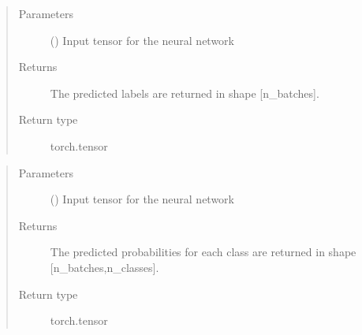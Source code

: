 \documentclass[letterpaper,10pt,english]{sphinxmanual}
\begin{document}
\begin{fulllineitems}

\begin{fulllineitems}
\label{\detokenize{models:models.CNN4.model.predict}}
\pysigstartsignatures
{}
\pysigstopsignatures\begin{quote}\begin{description}
\item[{Parameters}] \leavevmode
\sphinxAtStartPar
{} () \textendash{} Input tensor for the neural network

\item[{Returns}] \leavevmode
\sphinxAtStartPar
{} \textendash{} The predicted labels are returned in shape {[}n\_batches{]}.

\item[{Return type}] \leavevmode
\sphinxAtStartPar
torch.tensor

\end{description}\end{quote}

\end{fulllineitems}


\begin{fulllineitems}
\label{\detokenize{models:models.CNN4.model.prob}}
\pysigstartsignatures
{}
\pysigstopsignatures\begin{quote}\begin{description}
\item[{Parameters}] \leavevmode
\sphinxAtStartPar
{} () \textendash{} Input tensor for the neural network

\item[{Returns}] \leavevmode
\sphinxAtStartPar
The predicted probabilities for each class are returned in shape {[}n\_batches,n\_classes{]}.

\item[{Return type}] \leavevmode
\sphinxAtStartPar
torch.tensor

\end{description}\end{quote}


\end{fulllineitems}
\end{fulllineitems}
\end{document}
